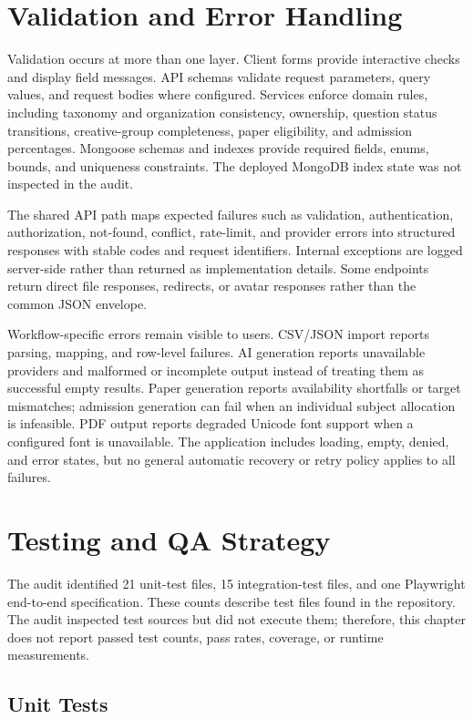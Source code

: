 \section{Validation and Error Handling}

Validation occurs at more than one layer. Client forms provide interactive checks and display field messages. API schemas validate request parameters, query values, and request bodies where configured. Services enforce domain rules, including taxonomy and organization consistency, ownership, question status transitions, creative-group completeness, paper eligibility, and admission percentages. Mongoose schemas and indexes provide required fields, enums, bounds, and uniqueness constraints. The deployed MongoDB index state was not inspected in the audit.

The shared API path maps expected failures such as validation, authentication, authorization, not-found, conflict, rate-limit, and provider errors into structured responses with stable codes and request identifiers. Internal exceptions are logged server-side rather than returned as implementation details. Some endpoints return direct file responses, redirects, or avatar responses rather than the common JSON envelope.

Workflow-specific errors remain visible to users. CSV/JSON import reports parsing, mapping, and row-level failures. AI generation reports unavailable providers and malformed or incomplete output instead of treating them as successful empty results. Paper generation reports availability shortfalls or target mismatches; admission generation can fail when an individual subject allocation is infeasible. PDF output reports degraded Unicode font support when a configured font is unavailable. The application includes loading, empty, denied, and error states, but no general automatic recovery or retry policy applies to all failures.

\section{Testing and QA Strategy}

The audit identified 21 unit-test files, 15 integration-test files, and one Playwright end-to-end specification. These counts describe test files found in the repository. The audit inspected test sources but did not execute them; therefore, this chapter does not report passed test counts, pass rates, coverage, or runtime measurements.

\subsection{Unit Tests}

